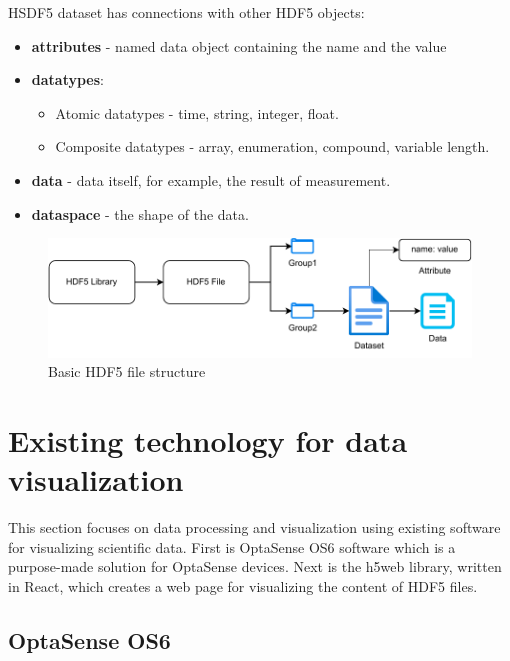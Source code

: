 \bigskip
HSDF5 dataset has connections with other HDF5 objects:

\begin{itemize}
    \item \textbf{attributes} - named data object containing the name and the value
    \item \textbf{datatypes}:
    \begin{itemize}
        \item Atomic datatypes - time, string, integer, float.
        \item Composite datatypes - array, enumeration, compound, variable length.
    \end{itemize}
    \item \textbf{data} - data itself, for example, the result of measurement.
    \item \textbf{dataspace} - the shape of the data.
\end{itemize}


\begin{figure}
    \centering
    \includegraphics[width=\linewidth]{pdf/hdf5_file_structure.pdf}
    \caption{Basic HDF5 file structure}
    \label{fig:filestructure}
\end{figure}

\newpage

\section{Existing technology for data visualization}\label{txt.design.existing}

This section focuses on data processing and visualization using existing software for visualizing scientific data. First is OptaSense OS6 software which is a purpose-made solution for OptaSense devices. Next is the h5web library, written in React, which creates a web page for visualizing the content of HDF5 files.

\subsection{OptaSense OS6}\label{txt.design.optasense}

